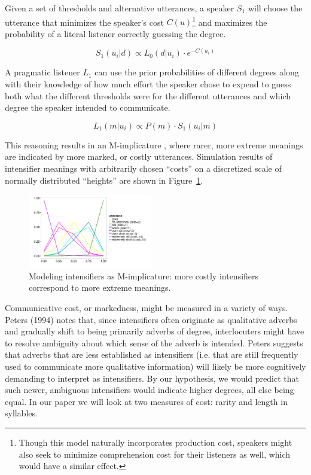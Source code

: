 \documentclass[10pt,letterpaper]{article}
\begin{document}
Given a set of thresholds and alternative utterances, a speaker $S_1$ will choose the utterance that minimizes the speaker's cost $C(u)$\footnote{Though this model naturally incorporates production cost, speakers might also seek to minimize comprehension cost for their listeners as well, which would have a similar effect.}
and maximizes the probability of a literal listener correctly guessing the degree.

\[ S_1(u_i | d) \propto L_0(d | u_i) \cdot e^{-C(u_i)} \]

A pragmatic listener $L_1$ can use the prior probabilities of different degrees along with their knowledge of how much effort the speaker chose to expend to guess both what the different thresholds were for the different utterances and which degree the speaker intended to communicate.

\[ L_1(m | u_i) \propto P(m) \cdot S_1(u_i | m) \]

This reasoning results in an M-implicature \cite{levinson}, where rarer, more extreme meanings are indicated by more marked, or costly utterances. Simulation results of intensifier meanings with arbitrarily chosen ``costs'' on a discretized scale of normally distributed ``heights'' are shown in Figure~\ref{model}.

\begin{figure}[ht]
\begin{center}
\includegraphics[width=0.48\textwidth]{analysis_files_for_writeup/images/model_results.png}
\end{center}
\caption{Modeling intensifiers as M-implicature: more costly intensifiers correspond to more extreme meanings.} 
\label{model}
\end{figure}

Communicative cost, or markedness,
might be measured in a variety of ways. Peters (1994) notes that, since intensifiers often originate as qualitative adverbs and gradually shift to being primarily adverbs of degree, interlocuters might have to resolve ambiguity about which sense of the adverb is intended. Peters suggests that adverbs that are less established as intensifiers (i.e. that are still frequently used to communicate more qualitative information) will likely be more cognitively demanding to interpret as intensifiers. By our hypothesis, we would predict that such newer, ambiguous intensifiers would indicate higher degrees, all else being equal. %
In our paper we will look at two measures of cost: rarity and length in syllables.
\end{document}
